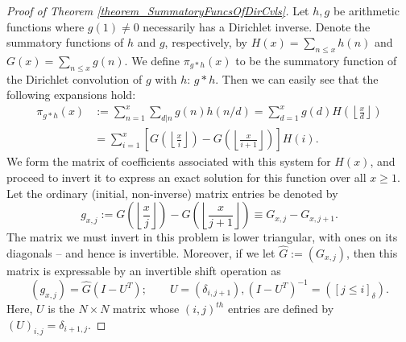 \documentclass[11pt,reqno,a4letter]{article}
\numberwithin{figure}{section}
\numberwithin{table}{section}
\newcommand{\Iverson}[1]{\ensuremath{\left[#1\right]_{\delta}}}
\newcommand{\floor}[1]{\left\lfloor #1 \right\rfloor}
\theoremstyle{plain}
\numberwithin{theorem}{section}
\theoremstyle{definition}
\begin{document}
\begin{proof}[Proof of Theorem \ref{theorem_SummatoryFuncsOfDirCvls}] 
\label{proofOf_theorem_SummatoryFuncsOfDirCvls} 
Let $h,g$ be arithmetic functions where $g(1) \neq 0$ 
necessarily has a Dirichlet inverse. Denote the summatory functions of $h$ and $g$, 
respectively, by $H(x) = \sum_{n \leq x} h(n)$ and $G(x) = \sum_{n \leq x} g(n)$. 
We define $\pi_{g \ast h}(x)$ to be the summatory function of the 
Dirichlet convolution of $g$ with $h$: $g \ast h$. 
Then we can easily see that the following expansions hold: 
\begin{align*} 
\pi_{g \ast h}(x) & := \sum_{n=1}^{x} \sum_{d|n} g(n) h(n/d) = \sum_{d=1}^x g(d) H\left(\floor{\frac{x}{d}}\right) \\ 
     & = \sum_{i=1}^x \left[G\left(\floor{\frac{x}{i}}\right) - G\left(\floor{\frac{x}{i+1}}\right)\right] H(i). 
\end{align*} 
We form the matrix of coefficients associated with this system for $H(x)$, and proceed to invert it to express an 
exact solution for this function over all $x \geq 1$. Let the ordinary (initial, non-inverse) matrix entries be denoted by 
\[
g_{x,j} := G\left(\floor{\frac{x}{j}}\right) - G\left(\floor{\frac{x}{j+1}}\right) \equiv G_{x,j} - G_{x,j+1}. 
\]
The matrix we must invert in this problem is lower triangular, with ones on its diagonals -- and hence is invertible. 
Moreover, if we let $\hat{G} := (G_{x,j})$, then this matrix is 
expressable by an invertible shift operation as 
\[
(g_{x,j}) = \hat{G} (I - U^{T}); \qquad U = (\delta_{i,j+1}), (I - U^T)^{-1} = (\Iverson{j \leq i}). 
\]
Here, $U$ is the $N \times N$ matrix whose $(i,j)^{th}$ entries are defined by 
$(U)_{i,j} = \delta_{i+1,j}$. 


\end{proof}
\end{document}
